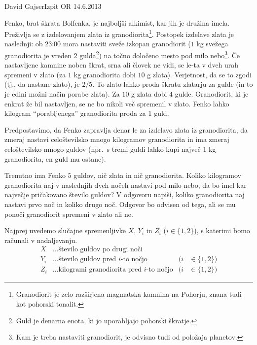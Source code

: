 \begin{naloga}{David Gajser}{Izpit OR 14.6.2013}
\begin{vprasanje}
Fenko, brat škrata Bolfenka, je najboljši alkimist, kar jih je družina imela.
Preživlja se z izdelovanjem zlata iz granodiorita\footnote{
Granodiorit je zelo razširjena magmatska kamnina na Pohorju,
znana tudi kot pohorski tonalit.
}.
Postopek izdelave zlata je naslednji:
ob 23:00 mora nastaviti sveže izkopan granodiorit
($1$ kg svežega granodiorita je vreden $2$ gulda\footnote{
Guld je denarna enota, ki jo uporabljajo pohorski škratje.
})
na točno določeno mesto pod milo nebo\footnote{
Kam je treba nastaviti granodiorit, je odvisno tudi od položaja planetov.
}.
Če nastavljene kamnine noben škrat, srna ali človek ne vidi,
se le-ta v dveh urah spremeni v zlato
(za $1$ kg granodiorita dobi $10$ g zlata).
Verjetnost, da se to zgodi (tj., da nastane zlato), je $2/5$.
To zlato lahko proda škratu zlatarju za gulde
(in to je edini možni način porabe zlata).
Za $10$ g zlata dobi $4$ gulde.
Granodiorit, ki je enkrat že bil nastavljen,
se ne bo nikoli več spremenil v zlato.
Fenko lahko kilogram ``porabljenega'' granodiorita proda za $1$ guld.

Predpostavimo, da Fenko zapravlja denar le za izdelavo zlata iz granodiorita,
da zmeraj nastavi celoštevilsko mnogo kilogramov granodiorita
in ima zmeraj celoštevilsko mnogo guldov
(npr.~s tremi guldi lahko kupi največ $1$ kg granodiorita, en guld mu ostane).

Trenutno ima Fenko $5$ guldov, nič zlata in nič granodiorita.
Koliko kilogramov granodiorita
naj v naslednjih dveh nočeh nastavi pod milo nebo,
da bo imel kar največje pričakovano število guldov?
V odgovoru napiši,
koliko granodiorita naj nastavi prvo noč in koliko drugo noč.
Odgovor bo odvisen od tega,
ali se mu ponoči granodiorit spremeni v zlato ali ne.
\end{vprasanje}

\begin{odgovor}
Najprej uvedemo slučajne spremenljivke $X$, $Y_i$ in $Z_i$ ($i \in \{1, 2\}$),
s katerimi bomo računali v nadaljevanju.
\begin{align*}
X &\dots \text{število guldov po drugi noči} \\
Y_i &\dots \text{število guldov pred $i$-to nočjo} & (i &\in \{1, 2\}) \\
Z_i &\dots \text{kilogrami granodiorita pred $i$-to nočjo} & (i &\in \{1, 2\})
\end{align*}


\end{odgovor}
\end{naloga}
